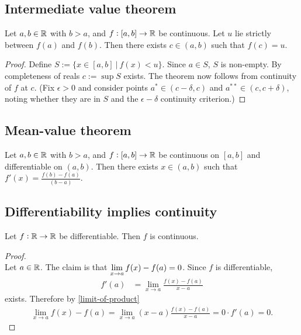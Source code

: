 \subsection{Intermediate value theorem}
\begin{theorem*}
  Let $a, b \in \mathbb{R}$ with $b > a$, and $f:[a,b] \to \mathbb{R}$ be continuous. Let $u$ lie strictly between
  $f(a)$ and $f(b)$. Then there exists $c \in (a, b)$ such that $f(c) = u$.
\end{theorem*}

\begin{proof}
  Define $S := \{x \in [a, b] ~|~ f(x) < u\}$. Since $a \in S$, $S$ is non-empty. By completeness
  of reals $c := \sup S$ exists. The theorem now follows from continuity of $f$ at $c$. (Fix
  $\epsilon > 0$ and consider points $a^* \in (c - \delta, c)$ and $a^{**} \in (c, c + \delta)$,
  noting whether they are in $S$ and the $\epsilon-\delta$ continuity criterion.)
\end{proof}


\subsection{Mean-value theorem}
\begin{theorem*}
  Let $a, b \in \mathbb{R}$ with $b > a$, and $f:[a,b] \to \mathbb{R}$ be continuous on $[a, b]$ and differentiable
  on $(a, b)$. Then there exists $x \in (a, b)$ such that $f'(x) = \frac{f(b) - f(a)}{(b - a)}$.
\end{theorem*}


\subsection{Differentiability implies continuity}
\begin{theorem*}
  Let $f:\mathbb{R}\to\mathbb{R}$ be differentiable. Then $f$ is continuous.
\end{theorem*}

\begin{proof}~\\
  Let $a \in \mathbb{R}$. The claim is that $\lim\limits_{x \to a} f(x) - f(a) = 0$. Since $f$ is differentiable,
  \begin{align*}
    f'(a) &= \lim_{x \to a} \frac{f(x) - f(a)}{x - a}
  \end{align*}
  exists. Therefore by \eqref{limit-of-product}
  \begin{align*}
    \lim_{x \to a} f(x) - f(a) = \lim_{x \to a} (x - a)\frac{f(x) - f(a)}{x - a} = 0\cdot f'(a) = 0.
  \end{align*}
\end{proof}

